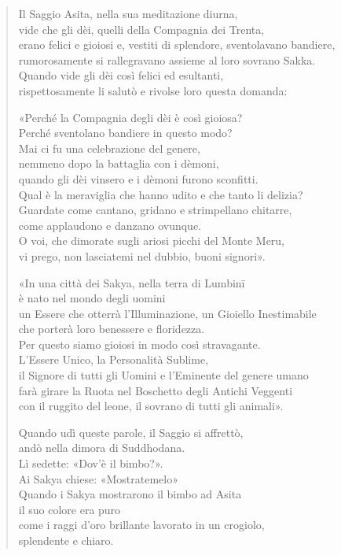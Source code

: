 \begin{quote}


Il Saggio Asita, nella sua meditazione diurna, \\
vide che gli dèi, quelli della Compagnia dei Trenta, \\
erano felici e gioiosi e, vestiti di splendore, sventolavano bandiere, \\
rumorosamente si rallegravano assieme al loro sovrano Sakka. \\
Quando vide gli dèi così felici ed esultanti, \\
rispettosamente li salutò e rivolse loro questa domanda:


«Perché la Compagnia degli dèi è così gioiosa? \\
Perché sventolano bandiere in questo modo? \\
Mai ci fu una celebrazione del genere, \\
nemmeno dopo la battaglia con i dèmoni, \\
quando gli dèi vinsero e i dèmoni furono sconfitti. \\
Qual è la meraviglia che hanno udito e che tanto li delizia? \\
Guardate come cantano, gridano e strimpellano chitarre, \\
come applaudono e danzano ovunque. \\
O voi, che dimorate sugli ariosi picchi del Monte Meru, \\
vi prego, non lasciatemi nel dubbio, buoni signori».


«In una città dei Sakya, nella terra di Lumbinī \\
è nato nel mondo degli uomini \\
un Essere che otterrà l’Illuminazione, un Gioiello Inestimabile \\
che porterà loro benessere e floridezza. \\
Per questo siamo gioiosi in modo così stravagante. \\
L’Essere Unico, la Personalità Sublime, \\
il Signore di tutti gli Uomini e l’Eminente del genere umano \\
farà girare la Ruota nel Boschetto degli Antichi Veggenti \\
con il ruggito del leone, il sovrano di tutti gli animali».


Quando udì queste parole, il Saggio si affrettò, \\
andò nella dimora di Suddhodana. \\
Lì sedette: «Dov’è il bimbo?». \\
Ai Sakya chiese: «Mostratemelo» \\
Quando i Sakya mostrarono il bimbo ad Asita \\
il suo colore era puro \\
come i raggi d’oro brillante lavorato in un crogiolo, \\
splendente e chiaro.



\end{quote}
